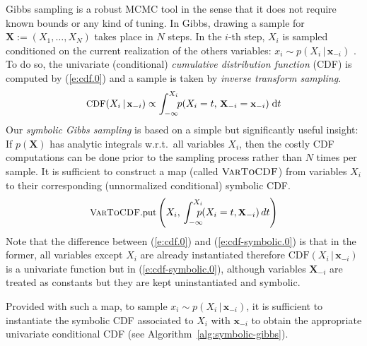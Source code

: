 \documentclass{article}
\newcommand{\bvec}[1]{\textbf{#1}}
\newcommand{\pr}{p}
\newcommand{\dd}{\;\mathrm{d}} %
\begin{document}
{Gibbs sampling is a robust MCMC tool in the sense that it does not require known bounds or any kind of tuning.
In Gibbs, drawing a sample for $\bvec{X} := (X_1, \ldots, X_N)$ takes place in $N$ steps.
In the $i$-th step, $X_i$ is sampled conditioned on the current realization of the others variables:
$x_i \sim \pr(X_i \,|\, \bvec{x}_{-i})$
\cite{bishop2006pattern}.
To do so, the univariate (conditional) 
\emph{cumulative distribution function} (CDF)
is computed by (\ref{e:cdf.0}) and a sample is taken by \emph{inverse transform sampling}. 
\begin{equation} \footnotesize
\label{e:cdf.0}
\text{CDF}(X_i  \,|\, \bvec{x}_{-i}) 
\propto
\int_{-\infty}^{X_i} \!\! \pr(X_i = t, \,\bvec{X}_{-i} = \bvec{x}_{-i})  \dd  t
\end{equation} 
%
Our \emph{symbolic Gibbs sampling} is based on a simple but significantly useful insight:
If $\pr(\bvec{X})$
has analytic integrals w.r.t.\ all variables $X_i$,
then the costly CDF computations can be done prior to the sampling process rather than $N$ times per sample. 
It is sufficient to construct a map (called $\textsc{VarToCDF}$) from variables $X_i$ to their corresponding (unnormalized conditional) symbolic CDF. 
\begin{equation} \footnotesize
\label{e:cdf-symbolic.0}	
\textsc{VarToCDF}\text{.put}
\left(
X_i, \, %
\int_{-\infty}^{X_i} \!\!\!\!\! \pr(X_i = t , \bvec{X}_{-i}) \, d  t
\right)
\end{equation} 
Note that the difference between (\ref{e:cdf.0}) and (\ref{e:cdf-symbolic.0}) is that in the former, 
all variables except $X_i$ are already instantiated therefore 
$\text{CDF}(X_i  \,|\, \bvec{x}_{-i})$ is a univariate function but in  (\ref{e:cdf-symbolic.0}), 
although variables $\bvec{X}_{-i}$ are treated as constants but they are kept uninstantiated and symbolic.

Provided with such a map, 
to sample $x_i \sim \pr(X_i \,|\, \bvec{x}_{-i})$,
it is sufficient to {\color{blue}instantiate the symbolic CDF associated to $X_i$ with  
$\bvec{x}_{-i}$} to obtain the appropriate univariate conditional CDF
(see Algorithm~\ref{alg:symbolic-gibbs}).

}
\end{document}
